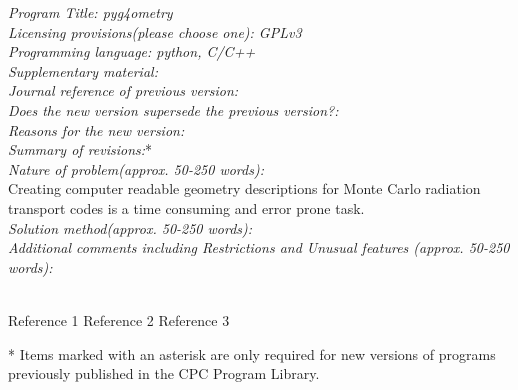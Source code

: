 \documentclass[final,5p,times,twocolumn]{elsarticle}
\begin{document}
\begin{small}
\noindent
{\em Program Title: pyg4ometry }                                         \\
{\em Licensing provisions(please choose one): GPLv3 }                                   \\
{\em Programming language: python, C/C++}                                   \\

{\em Supplementary material:}                                 \\
{\em Journal reference of previous version:}                  \\
{\em Does the new version supersede the previous version?:}   \\
{\em Reasons for the new version:}\\
{\em Summary of revisions:}*\\

{\em Nature of problem(approx. 50-250 words):}\\
Creating computer readable geometry descriptions for Monte Carlo radiation transport codes is a time consuming and error prone task.  \\
{\em Solution method(approx. 50-250 words):}\\
{\em Additional comments including Restrictions and Unusual features (approx. 50-250 words):}\\
   \\

\begin{thebibliography}{0}
Reference 1         %
Reference 2         %
Reference 3         %
\end{thebibliography}
* Items marked with an asterisk are only required for new versions
of programs previously published in the CPC Program Library.\\
\end{small}
\end{document}
